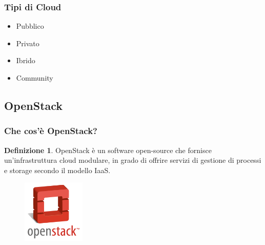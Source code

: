 \documentclass{beamer}
\theoremstyle{definition}
\newtheorem{definizione}{Definizione}
\theoremstyle{plain}
\begin{document}
\begin{frame}
\frametitle{Tipi di Cloud}
\begin{itemize}
\item
Pubblico
\item
Privato
\item
Ibrido
\item
Community
\end{itemize}
\end{frame}
\subsection{OpenStack}
\begin{frame}
\frametitle{Che cos'è OpenStack?}
\begin{definizione}
\alert{OpenStack} è un software open-source che fornisce un'infrastruttura cloud modulare, in grado di offrire servizi di gestione di processi e storage secondo il modello IaaS.

\begin{figure}[!h]
	\begin{center}
\includegraphics[width=3cm]{openstack.png}
\end{center}
\end{figure}

\end{definizione}
\end{frame}
\end{document}
